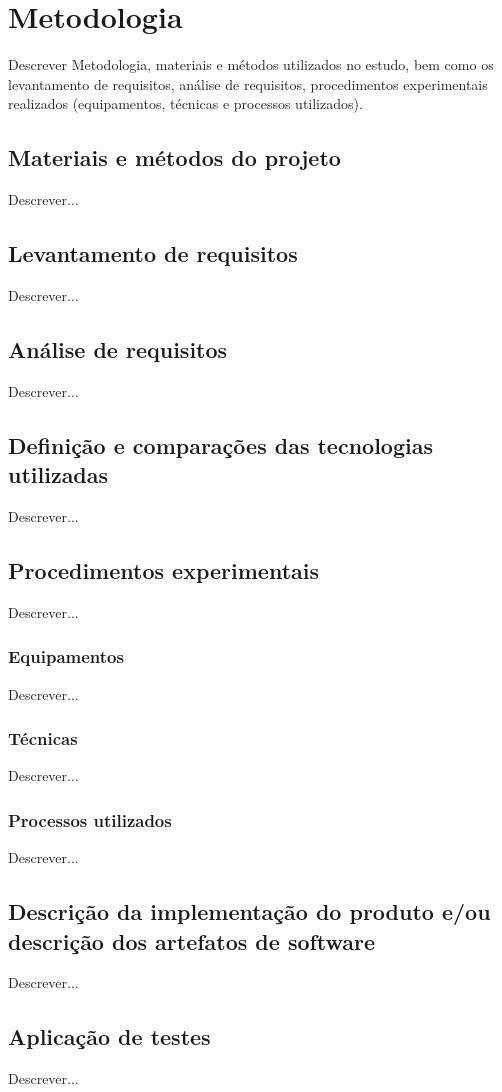 \chapter{Metodologia}
\label{cap:03}

Descrever Metodologia, materiais e métodos utilizados no estudo, bem como os  levantamento de requisitos, análise de requisitos,  procedimentos   experimentais   realizados (equipamentos, técnicas e processos utilizados).

\section{Materiais e métodos do projeto}
Descrever...


\section{Levantamento de requisitos}
Descrever...


\section{Análise de requisitos}
Descrever...


\section{Definição e comparações das tecnologias utilizadas}
Descrever...


\section{Procedimentos experimentais}
Descrever...


\subsection{Equipamentos}
Descrever...


\subsection{Técnicas}
Descrever...


\subsection{Processos utilizados}
Descrever...


\section{Descrição da implementação do produto e/ou descrição dos artefatos de software}
Descrever...


\section{Aplicação de testes}
Descrever...
